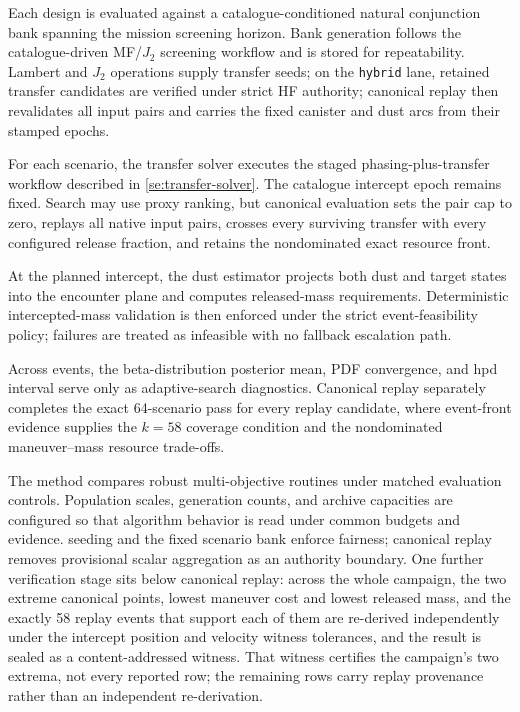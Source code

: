     Each design is evaluated against a catalogue-conditioned natural conjunction bank spanning the mission screening horizon. Bank generation follows the catalogue-driven MF/\(J_2\) screening workflow and is stored for repeatability. Lambert and \(J_2\) operations supply transfer seeds; on the \texttt{hybrid} lane, retained transfer candidates are verified under strict HF authority; canonical replay then revalidates all input pairs and carries the fixed canister and dust arcs from their stamped epochs.

    For each scenario, the transfer solver executes the staged phasing-plus-transfer workflow described in \cref{se:transfer-solver}. The catalogue intercept epoch remains fixed. Search may use proxy ranking, but canonical evaluation sets the pair cap to zero, replays all native input pairs, crosses every surviving transfer with every configured release fraction, and retains the nondominated exact resource front.

    At the planned intercept, the dust estimator projects both dust and target states into the encounter plane and computes released-mass requirements. Deterministic intercepted-mass validation is then enforced under the strict event-feasibility policy; failures are treated as infeasible with no fallback escalation path.

    Across events, the beta-distribution posterior mean, PDF convergence, and \gls{hpd} interval serve only as adaptive-search diagnostics. Canonical replay separately completes the exact 64-scenario pass for every replay candidate, where event-front evidence supplies the \(k=58\) coverage condition and the nondominated maneuver--mass resource trade-offs.

    The method compares robust multi-objective routines under matched evaluation controls. Population scales, generation counts, and archive capacities are configured so that algorithm behavior is read under common budgets and evidence.  seeding and the fixed scenario bank enforce fairness; canonical replay removes provisional scalar aggregation as an authority boundary. One further verification stage sits below canonical replay: across the whole campaign, the two extreme canonical points, lowest maneuver cost and lowest released mass, and the exactly 58 replay events that support each of them are re-derived independently under the intercept position and velocity witness tolerances, and the result is sealed as a content-addressed witness. That witness certifies the campaign's two extrema, not every reported row; the remaining rows carry replay provenance rather than an independent re-derivation.

